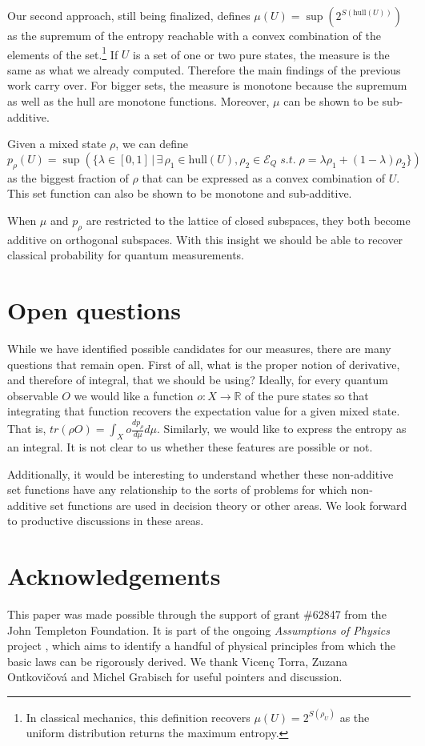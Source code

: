 \documentclass{styles/svproc}
\newcommand\hull{\mathrm{hull}}
\begin{document}
Our second approach, still being finalized\cite{aop-book}, defines $\mu(U) = \sup(2^{S(\hull(U))})$ as the supremum of the entropy reachable with a convex combination of the elements of the set.\footnote{In classical mechanics, this definition recovers $\mu(U) = 2^{S(\rho_U)}$ as the uniform distribution returns the maximum entropy.} If $U$ is a set of one or two pure states, the measure is the same as what we already computed. Therefore the main findings of the previous work carry over. For bigger sets, the measure is monotone because the supremum as well as the hull are monotone functions. Moreover, $\mu$ can be shown to be sub-additive.

Given a mixed state $\rho$, we can define $p_{\rho}(U) = \sup(\{ \lambda \in [0,1] \, | \, \exists \, \rho_1 \in \hull(U), \rho_2 \in \mathcal{E}_Q \; s.t. \;  \rho = \lambda \rho_1 + (1-\lambda) \rho_2 \})$ as the biggest fraction of $\rho$ that can be expressed as a convex combination of $U$. This set function can also be shown to be monotone and sub-additive.

When $\mu$ and $p_\rho$ are restricted to the lattice of closed subspaces, they both become additive on orthogonal subspaces. With this insight we should be able to recover classical probability for quantum measurements.

\section{Open questions}

While we have identified possible candidates for our measures, there are many questions that remain open. First of all, what is the proper notion of derivative, and therefore of integral, that we should be using? Ideally, for every quantum observable $O$ we would like a function $o : X \to \mathbb{R}$ of the pure states so that integrating that function recovers the expectation value for a given mixed state. That is, $tr(\rho O) = \int_X o \frac{dp_\rho}{d\mu} d\mu$. Similarly, we would like to express the entropy as an integral. It is not clear to us whether these features are possible or not.

Additionally, it would be interesting to understand whether these non-additive set functions have any relationship to the sorts of problems for which non-additive set functions are used in decision theory or other areas. We look forward to productive discussions in these areas.

\section{Acknowledgements}

This paper was made possible through the support of grant \#62847 from the John Templeton Foundation. It is part of the ongoing \textit{Assumptions of Physics} project \cite{aop-book}, which aims to identify a handful of physical principles from which the basic laws can be rigorously derived.  We thank Vicen\c{c} Torra, Zuzana Ontkovi\v{c}ov\'{a} and Michel Grabisch for useful pointers and discussion.

%
%


\end{document}
